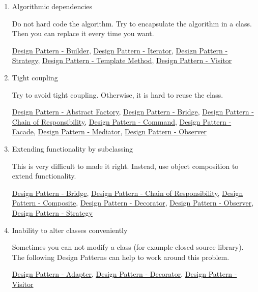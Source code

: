 \documentclass[11pt]{article}
\begin{document}
\begin{enumerate}
\item Algorithmic dependencies

Do not hard code the algorithm.
Try to encapsulate the algorithm in a class.
Then you can replace it every time you want.

\href{../../../../roam/20220413201034-design_pattern_builder.org}{Design Pattern - Builder}, \href{../../../../roam/20220413201100-design_pattern_iterator.org}{Design Pattern - Iterator}, \href{../../../../roam/20220413201128-design_pattern_strategy.org}{Design Pattern - Strategy}, \href{../../../../roam/20220413201147-design_pattern_template_method.org}{Design Pattern - Template Method}, \href{../../../../roam/20220413201212-design_pattern_visitor.org}{Design Pattern - Visitor}

\item Tight coupling

Try to avoid tight coupling.
Otherwise, it is hard to reuse the class.

\href{../../../../roam/20220413195148-design_pattern_abstract_factory.org}{Design Pattern - Abstract Factory}, \href{../../../../roam/20220413200620-design_pattern_bridge.org}{Design Pattern - Bridge}, \href{../../../../roam/20220413200329-design_pattern_chain_of_responsibility.org}{Design Pattern - Chain of Responsibility}, \href{../../../../roam/20220413200356-design_pattern_command.org}{Design Pattern - Command}, \href{../../../../roam/20220413201512-design_pattern_facade.org}{Design Pattern - Facade}, \href{../../../../roam/20220413201546-design_pattern_mediator.org}{Design Pattern - Mediator}, \href{../../../../roam/20211103140808-observer_pattern.org}{Design Pattern - Observer}

\item Extending functionality by subclassing

This is very difficult to made it right.
Instead, use object composition to extend functionality.

\href{../../../../roam/20220413200620-design_pattern_bridge.org}{Design Pattern - Bridge}, \href{../../../../roam/20220413200329-design_pattern_chain_of_responsibility.org}{Design Pattern - Chain of Responsibility}, \href{../../../../roam/20220413202016-design_pattern_composite.org}{Design Pattern - Composite}, \href{../../../../roam/20220413202051-design_pattern_decorator.org}{Design Pattern - Decorator}, \href{../../../../roam/20211103140808-observer_pattern.org}{Design Pattern - Observer}, \href{../../../../roam/20220413201128-design_pattern_strategy.org}{Design Pattern - Strategy}

\item Inability to alter classes conveniently

Sometimes you can not modify a class (for example closed source library).
The following Design Patterns can help to work around this problem.

\href{../../../../roam/20220413202255-design_pattern_adapter.org}{Design Pattern - Adapter}, \href{../../../../roam/20220413202051-design_pattern_decorator.org}{Design Pattern - Decorator}, \href{../../../../roam/20220413201212-design_pattern_visitor.org}{Design Pattern - Visitor}
\end{enumerate}
\end{document}
